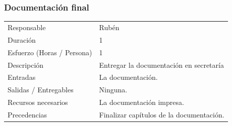 \subsubsection{Documentaci\'{o}n final}
\begin{table}[H]
    \begin{center}
        \begin{tabular}{l p{8cm}}
            Responsable                           & Rub\'{e}n \\
            Duraci\'{o}n                          & 1 \\ 
            Esfuerzo (Horas / Persona)            & 1 \\
            Descripci\'{o}n                       & Entregar la documentaci\'{o}n en secretar\'{i}a \\
            Entradas                              & La documentaci\'{o}n. \\
            Salidas / Entregables                 & Ninguna. \\
            Recursos necesarios                   & La documentaci\'{o}n impresa. \\
            Precedencias                          & Finalizar cap\'{i}tulos de la documentaci\'{o}n. \\
        \end{tabular}
    \end{center}
    
\end{table}

